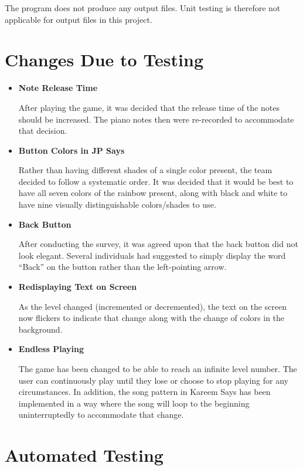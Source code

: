\documentclass[12pt, titlepage]{article}
\begin{document}
\begin{itemize}
\begin{itemize}
\end{itemize}

\par The program does not produce any output files. Unit testing is therefore not applicable for output files in this project.

\section{Changes Due to Testing}
\begin{itemize}
\item \textbf {Note Release Time}
\par After playing the game, it was decided that the release time of the notes should be increased. The piano notes then were re-recorded to accommodate that decision.


\item \textbf {Button Colors in JP Says}
\par Rather than having different shades of a single color present, the team decided to follow a systematic order. It was decided that it would be best to have all seven colors of the rainbow present, along with black and white to have nine visually distinguishable colors/shades to use.

\item \textbf {Back Button}
\par After conducting the survey, it was agreed upon that the back button did not look elegant. Several individuals had suggested to simply display the word “Back” on the button rather than the left-pointing arrow.

\item \textbf {Redisplaying Text on Screen}
\par As the level changed (incremented or decremented), the text on the screen now flickers to indicate that change along with the change of colors in the background.

\item \textbf {Endless Playing}
\par The game has been changed to be able to reach an infinite level number. The user can continuously play until they lose or choose to stop playing for any circumstances. In addition, the song pattern in Kareem Says has been implemented in a way where the song will loop to the beginning uninterruptedly to accommodate that change.
\end{itemize}

\section{Automated Testing}


\end{itemize}
\end{document}
